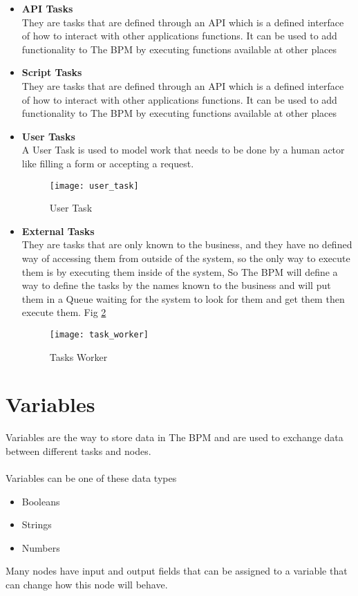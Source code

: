 \begin{itemize}
    \item \textbf{API Tasks} \\
    They are tasks that are defined through an API which is a defined interface of how to interact
    with other applications functions. It can be used to add functionality to The BPM by
    executing functions available at other places
    \item \textbf{Script Tasks} \\
    They are tasks that are defined through an API which is a defined interface of how to interact
    with other applications functions. It can be used to add functionality to The BPM by
    executing functions available at other places
    \item \textbf{User Tasks} \\
    A User Task is used to model work that needs to be done by a human actor like filling a form
or accepting a request.

\begin{figure}[h]
    \texttt{[image: user\_task]}
    \centering
    \caption{User Task}
    \label{fig:user_task}
\end{figure}

    \item \textbf{External Tasks} \\
    They are tasks that are only known to the business, and they have no defined way of accessing
them from outside of the system, so the only way to execute them is by executing them inside
of the system, So The BPM will define a way to define the tasks by the names known to the
business and will put them in a Queue waiting for the system to look for them and get them
then execute them. Fig \ref{fig:task_worker}

\begin{figure}[h]
    \texttt{[image: task\_worker]}
    \centering
    \caption{Tasks Worker}
    \label{fig:task_worker}
\end{figure}

\end{itemize}

\section{Variables}

Variables are the way to store data in The BPM and are used to exchange data between different tasks
and nodes.\\\\
Variables can be one of these data types
\begin{itemize}
    \item Booleans
    \item Strings
    \item Numbers
\end{itemize}
Many nodes have input and output fields that can be assigned to a variable that can change how this
node will behave.

